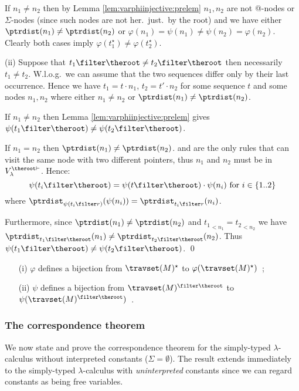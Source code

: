 If $n_1 \neq n_2$ then by Lemma \ref{lem:varphiinjective:prelem}
$n_1,n_2$ are not @-nodes or $\Sigma$-nodes (since such nodes are
not her.\ just.\ by the root) and we have either $\ptrdist(n_1) \neq
\ptrdist(n_2)$ or $\varphi(n_1) = \psi(n_1) \neq \psi(n_2) =
\varphi(n_2)$. Clearly both cases imply $\varphi(t_1^\star) \neq
\varphi(t_2^\star)$.
\smallskip

\noindent (ii) Suppose that $t_1 \filter \theroot \neq t_2 \filter \theroot$ then
necessarily $t_1 \neq t_2$. W.l.o.g.\ we can assume that the two
sequences differ only by their last occurrence. Hence we have $t_1 =
t \cdot n_1$, $t_2 = t' \cdot n_2$ for some sequence $t$ and some
nodes $n_1, n_2$ where either $n_1\neq n_2$ or $\ptrdist(n_1) \neq
\ptrdist(n_2)$.

If $n_1 \neq n_2$ then Lemma \ref{lem:varphiinjective:prelem} gives
$\psi( t_1\filter \theroot ) \neq \psi( t_2\filter \theroot )$.

If $n_1 = n_2$ then $\ptrdist(n_1) \neq \ptrdist(n_2)$.
 and  are the only rules
that can visit the same node with two different pointers, thus $n_1$
and $n_2$ must be in $V_\lambda^{\theroot\vdash}$. Hence:
\begin{equation*}
\psi(t_i\filter \theroot) = \psi(t\filter \theroot) \cdot \psi(n_i) \mbox{ for $i
\in \{1..2\}$}
\end{equation*}
where $\ptrdist_{\psi(t_i\filter r)}(\psi(n_i)) =
\ptrdist_{t_i\filter r}(n_i)$.

Furthermore, since $\ptrdist(n_1) \neq \ptrdist(n_2)$ and
${t_1}_{<n_1} = {t_2}_{<n_2}$ we have $\ptrdist_{t_1\filter \theroot}(n_1)
\neq \ptrdist_{t_2\filter \theroot}(n_2)$. Thus $\psi(t_1\filter \theroot) \neq
\psi(t_2\filter \theroot)$. \qed


\begin{corollary} \hfill
\label{cor:varphi_bij}
\begin{itemize}
\item[(i)] $\varphi$ defines a bijection from $\travset(M)^\star$
to $\varphi(\travset(M)^\star)$\ ;
\item[(ii)] $\psi$ defines a bijection from $\travset(M)^{\filter \theroot}$ to
$\psi(\travset(M)^{\filter \theroot})$\ .
\end{itemize}
\end{corollary}

\subsubsection{The correspondence theorem}
We now state and prove the correspondence theorem for the
simply-typed $\lambda$-calculus without interpreted constants
($\Sigma = \emptyset$). The result extends immediately to the
simply-typed $\lambda$-calculus with \emph{uninterpreted} constants
since we can regard constants as being free variables.


